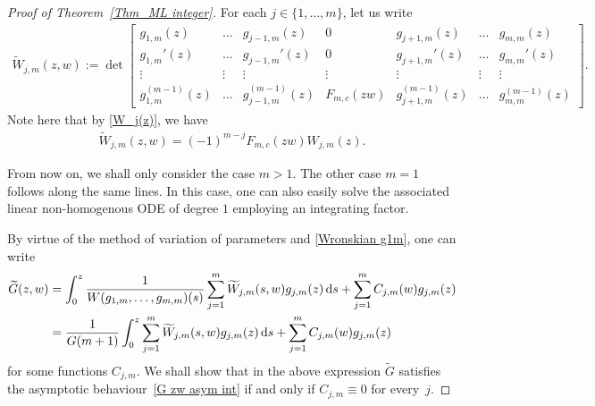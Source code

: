 \documentclass[pdftex]{sigma}
\numberwithin{equation}{section}
\newcommand{\1}{\chi}
\begin{document}
\begin{proof}[Proof of Theorem~\ref{Thm_ML integer}]
	For each $j \in \{1,\dots, m\}$, let us write
	\begin{gather*}
		\widetilde{W}_{j,m}(z,w):=\det
		\begin{bmatrix}
			g_{1,m}(z) & \dots & g_{j-1,m}(z) & 0 & g_{j+1,m}(z) & \dots & g_{m,m}(z)
			\\
			g_{1,m}'(z) & \dots & g_{j-1,m}'(z) & 0 & g_{j+1,m}'(z) & \dots & g_{m,m}'(z)
			\\
			\vdots & \vdots & \vdots & \vdots & \vdots & \vdots & \vdots
			\\
			g_{1,m}^{(m-1)}(z) & \dots & g_{j-1,m}^{(m-1)}(z) & F_{m,c}(zw) & g_{j+1,m}^{(m-1)}(z) & \dots & g_{m,m}^{(m-1)}(z)
		\end{bmatrix}.
	\end{gather*}
	Note here that by \eqref{W_j(z)}, we have
	\begin{gather} \label{Wj zw F Wj}
		\widetilde{W}_{j,m}(z,w)=(-1)^{m-j} F_{m,c}(zw) W_{j,m}(z).
	\end{gather}
	
	From now on, we shall only consider the case $m>1$. The other case $m=1$ follows along the same lines. In this case, one can also easily solve the associated linear non-homogenous ODE of degree $1$ employing an integrating factor.
	
	By virtue of the method of variation of parameters and \eqref{Wronskian g1m}, one can write
	\begin{align*}
			\widetilde{G}(z,w)&= \int_0^z \frac{1}{W(g_{1,m},\dots,g_{m,m})(s)}\sum_{j=1}^{m} 	\widetilde{W}_{j,m}(s,w) g_{j,m}(z)\,{\rm d}s+ \sum_{j=1}^{m} C_{j,m}(w) g_{j,m}(z)
			\\
			&=\frac{1}{G(m+1)}\int_0^z \sum_{j=1}^{m} 	\widetilde{W}_{j,m}(s,w) g_{j,m}(z)\,{\rm d}s+ \sum_{j=1}^{m} C_{j,m}(w) g_{j,m}(z)
	\end{align*}
	for some functions $C_{j,m}$. We shall show that in the above expression $\widetilde{G}$ satisfies the asymptotic behaviour~\eqref{G zw asym int} if and only if $C_{j,m} \equiv 0$ for every~$j$.
	

\end{proof}
\end{document}
